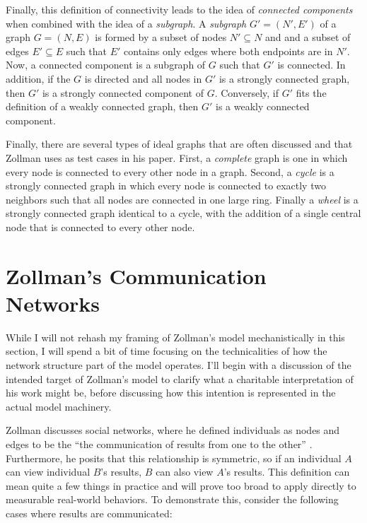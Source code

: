 Finally, this definition of connectivity leads to the idea of
\emph{connected components} when combined with the idea of a
\emph{subgraph}. A \emph{subgraph} \(G' = (N', E')\) of a graph
\(G = (N, E)\) is formed by a subset of nodes \(N' \subseteq N\) and and
a subset of edges \(E' \subseteq E\) such that \(E'\) contains only
edges where both endpoints are in \(N'\). Now, a connected component is
a subgraph of \(G\) such that \(G'\) is connected. In addition, if the
\(G\) is directed and all nodes in \(G'\) is a strongly connected graph,
then \(G'\) is a strongly connected component of \(G\). Conversely, if
\(G'\) fits the definition of a weakly connected graph, then \(G'\) is a
weakly connected component.

Finally, there are several types of ideal graphs that are often
discussed and that Zollman uses as test cases in his paper. First, a
\emph{complete} graph is one in which every node is connected to every
other node in a graph. Second, a \emph{cycle} is a strongly connected
graph in which every node is connected to exactly two neighbors such
that all nodes are connected in one large ring. Finally a \emph{wheel}
is a strongly connected graph identical to a cycle, with the addition of
a single central node that is connected to every other node.

\hypertarget{zollmans-communication-networks}{%
\section{Zollman's Communication
Networks}\label{zollmans-communication-networks}}

While I will not rehash my framing of Zollman's model mechanistically in
this section, I will spend a bit of time focusing on the technicalities
of how the network structure part of the model operates. I'll begin with
a discussion of the intended target of Zollman's model to clarify what a
charitable interpretation of his work might be, before discussing how
this intention is represented in the actual model machinery.

Zollman discusses social networks, where he defined individuals as nodes
and edges to be the ``the communication of results from one to the
other'' \autocite[p.~25][]{zollmanEpistemicBenefitTransient2009}.
Furthermore, he posits that this relationship is symmetric, so if an
individual \(A\) can view individual \(B\)'s results, \(B\) can also
view \(A\)'s results. This definition can mean quite a few things in
practice and will prove too broad to apply directly to measurable
real-world behaviors. To demonstrate this, consider the following cases
where results are communicated:

